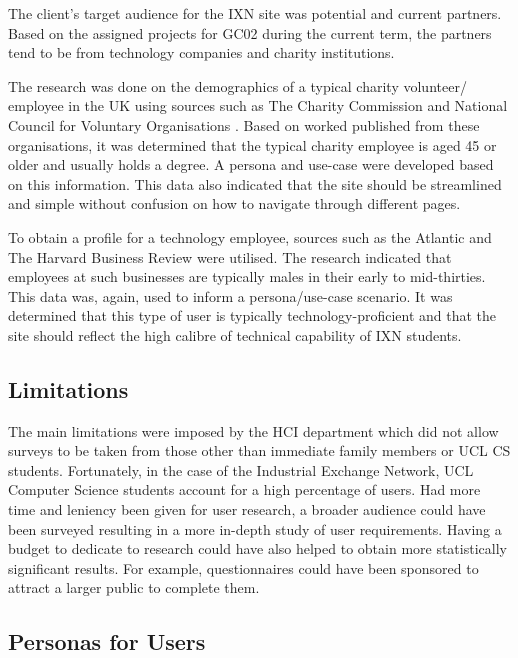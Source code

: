 \documentclass[fontsize=11pt]{extarticle}
\numberwithin{figure}{section} %
\numberwithin{table}{section}%
\begin{document}
The client's target audience for the IXN site was potential and current
partners. Based on the assigned projects for GC02 during the current
term, the partners tend to be from technology companies and charity
institutions.

The research was done on the demographics of a typical charity
volunteer/ employee in the UK using sources such as The Charity
Commission \cite{ps2} and National Council for Voluntary Organisations
\cite{ps3}. Based on worked published from these organisations, it was
determined that the typical charity employee is aged 45 or older and
usually holds a degree. A persona and use-case were developed based on
this information. This data also indicated that the site should be
streamlined and simple without confusion on how to navigate through
different pages.

To obtain a profile for a technology employee, sources such as the
Atlantic \cite{ps4} and The Harvard Business Review \cite{ps5} were
utilised. The research indicated that employees at such businesses are
typically males in their early to mid-thirties. This data was, again,
used to inform a persona/use-case scenario. It was determined that this
type of user is typically technology-proficient and that the site should
reflect the high calibre of technical capability of IXN students.

\hypertarget{limitations}{%
\subsection{Limitations}\label{limitations}}

The main limitations were imposed by the HCI department which did not
allow surveys to be taken from those other than immediate family members
or UCL CS students. Fortunately, in the case of the Industrial Exchange
Network, UCL Computer Science students account for a high percentage of
users. Had more time and leniency been given for user research, a
broader audience could have been surveyed resulting in a more in-depth
study of user requirements. Having a budget to dedicate to research
could have also helped to obtain more statistically significant results.
For example, questionnaires could have been sponsored to attract a
larger public to complete them.

\hypertarget{personas-for-users}{%
\subsection{Personas for Users}\label{personas-for-users}}
\end{document}
